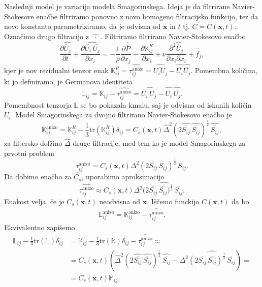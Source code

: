 \documentclass[mat2, tisk]{fmfdelo}
\newcommand{\bd}{\textbf}
\begin{document}
Naslednji model je variacija modela Smagorinskega. Ideja je da 
filtrirane Navier-Stokesove enačbe filtriramo ponovno z novo homogeno
filtracijsko funkcijo, ter da novo konstanto parametriziramo, da je odvisna od $\bd{x}$ in $t$
tj. $C = C(\bd{x}, t)$. Označimo drugo filtracijo z $\widehat{\,\,\cdot\,\,}$.
Filtriramo filtrirano Navier-Stokesovo enačbo 
$$
\frac{\partial \widehat{\overline{U}_j}}{\partial t} + \frac{\partial \widehat{\overline{U_i}\, \overline{U_j}}}{\partial x_i} = -\frac{1}{\rho} \frac{\partial \hat{\overline{P}}}{\partial x_j} 
- \frac{\partial \mathbb{K}_{ij}^R}{\partial x_i}+ \nu \frac{\partial^2 \widehat{\overline{U}}_j}{\partial x_i \partial x_i} + \hat{\overline{f}}_j,
$$
kjer je nov rezidualni tenzor enak $\mathbb{K}_{ij}^R = \widehat{\tau_{ij}^\text{anizo}} = \widehat{\overline{U_i U_j}} - \widehat{\overline{U_i}} \widehat{\overline{U_j}}$.
Pomembna količina, ki jo definiramo, je Germanova identiteta
$$
\mathbb{L}_{ij} = \mathbb{K}_{ij} - \widehat{\tau_{ij}^\text{anizo}} = \widehat{\overline{U_i} \,\overline{U_j}} - \widehat{\overline{U_i}}\, \widehat{\overline{U_j}}.
$$
Pomembnost tenzorja $\mathbb{L}$ se bo pokazala kmalu, saj je 
odvisna od iskanih količin $\overline{U_i}$. 
Model Smagorinskega za dvojno filtrirano Navier-Stokesovo enačbo je
$$
\mathbb{K}_{ij}^\text{anizo} = \mathbb{K}_{ij}^R - \frac{1}{3} \text{tr}(\mathbb{K}_{ij}^R) \delta_{ij} = C_s(\bd{x}, t) \widehat{\Delta}^2 (2 \widehat{\overline{S_{ij}}} \,\widehat{\overline{S_{ij}}})^\frac{1}{2} \,\widehat{\overline{S_{ij}}},
$$
za filtersko dolžino $\widehat{\Delta}$ druge filtracije, 
med tem ko je model Smagorinskega za prvotni problem
$$
\tau_{ij}^\text{anizo} = C_s(\bd{x}, t) \Delta^2 (2 \overline{S_{ij}} \,\overline{S_{ij}})^\frac{1}{2} \,\overline{S_{ij}}.
$$
Da dobimo enačbo za $\widehat{C_s}$, uporabimo aproksimacijo 
$$
\widehat{\tau_{ij}^\text{anizo}} \approx C_s(\bd{x}, t) \Delta^2 (\widehat{2 \overline{S_{ij}} \,\overline{S_{ij}})^\frac{1}{2} \,\overline{S_{ij}}}.
$$
Enakost velja, če je $C_s(\bd{x}, t)$ neodvisna od $\bd{x}$. 
Iščemo funckijo $C(\bd{x}, t)$ da bo 
\begin{align*}
\mathbb{L}_{ij}^\text{anizo} = \mathbb{K}_{ij}^\text{anizo} - \widehat{\tau_{ij}^\text{anizo}}.
\end{align*}
Ekvivalentno zapišemo 
\begin{align*}
\mathbb{L}_{ij} - \frac{1}{3}\text{tr}(\mathbb{L}) \delta_{ij} &= \mathbb{K}_{ij} - \frac{1}{3}\text{tr}(\mathbb{K}) \delta_{ij} - \widehat{\tau_{ij}^\text{anizo}} \approx \\
&= C_s(\bd{x}, t)(\widehat{\Delta}^2 (2 \widehat{\overline{S_{ij}}} \,\widehat{\overline{S_{ij}}})^\frac{1}{2} \,\widehat{\overline{S_{ij}}} - \Delta^2 \widehat{(2 \overline{S_{ij}} \,\overline{S_{ij}})^\frac{1}{2} \,\overline{S_{ij}}}) = \\
&= C_s(\bd{x}, t)\mathbb{M}_{ij},
\end{align*}
\end{document}
